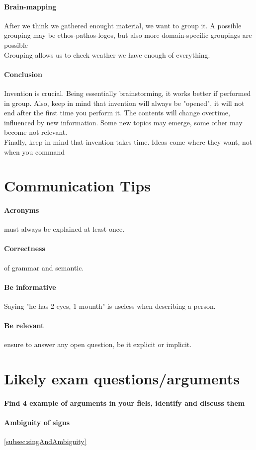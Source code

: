 \documentclass{article}
\begin{document}
\paragraph{Brain-mapping} After we think we gathered enought material, we want to group it. A possible grouping may be ethos-pathos-logos, but also more domain-specific groupings are possible\\
Grouping allows us to check weather we have enough of everything.
\paragraph{Conclusion} Invention is crucial. Being essentially brainstorming, it works better if performed in group. Also, keep in mind that invention will always be "opened", it will not end after the first time you perform it. The contents will change overtime, influenced by new information. Some new topics may emerge, some other may become not relevant.\\
Finally, keep in mind that invention takes time. Ideas come where they want, not when you command





\appendix
\section{Communication Tips}
\paragraph{Acronyms} must always be explained at least once.
\paragraph{Correctness} of grammar and semantic.
\paragraph{Be informative} Saying "he has 2 eyes, 1 mounth" is useless when describing a person.
\paragraph{Be relevant} ensure to answer any open question, be it explicit or implicit.
\section{Likely exam questions/arguments}
\paragraph{Find 4 example of arguments in your fiels, identify and discuss them}
\paragraph{Ambiguity of signs} \ref{subsec:singAndAmbiguity}
\end{document}
